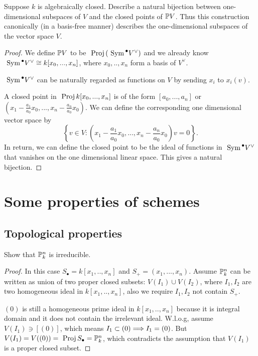 \documentclass[11pt]{book} %
\begin{document}
\begin{exr}
Suppose $k$ is algebraically closed. Describe a natural bijection between one-dimensional subspaces of $V$ and the closed points of $\mathbb P V$. Thus this construction canonically (in a basis-free manner) describes the one-dimensional subspaces of the vector space $V$.
\end{exr}
\begin{proof}
We define $\mathbb P V$ to be $\text{ Proj\,} (\text{ Sym\,}^\bullet V^\vee)$ and we already know $\text{ Sym\,}^\bullet V^\vee\cong k[x_0,...,x_n]$, where $x_0,..,x_n$ form a basis  of $V^\vee$.

$\text{ Sym\,}^\bullet V^\vee$ can be naturally regarded as functions on $V$ by sending $x_i$ to $x_i(v)$.

A closed point in $\text{ Proj\,} k[x_0,...,x_n]$ is of the form $[a_0,...,a_n]$ or $\left(x_1-\frac{a_1}{a_0}x_0,...,x_n-\frac{a_n}{a_0}x_0\right)$. We can define the corresponding one dimensional vector space by 
$$
\left\{v\in V: \left(x_1-\frac{a_1}{a_0}x_0,...,x_n-\frac{a_n}{a_0}x_0\right)v=0\right\}.
$$
In return, we can define the closed point to be the ideal of functions in $\text{ Sym\,}^\bullet V^\vee$ that vanishes on the one dimensional linear space.
This gives a natural bijection.
\end{proof}
\chapter{Some properties of schemes}
\section{Topological properties}
\begin{exr}
Show that $\mathbb P^n_k$ is irreducible.
\end{exr}
\begin{proof}
In this case $S_\bullet=k[x_1,..,x_n]$ and $S_+=(x_1,...,x_n)$.
Assume $\mathbb P^n_k$ can be written as union of two proper closed subsets: $V(I_1)\cup V(I_2)$, where $I_1,I_2$ are two homogeneous ideal in $k[x_1,..,x_n]$, also we require $I_1,I_2$ not contain $S_+$.

$(0)$ is still a homogeneous prime ideal in $k[x_1,..,x_n]$ because it is integral domain and it does not contain the irrelevant ideal. W.l.o.g, assume $V(I_1)\ni [(0)]$, which means $I_1\subset (0)\Longrightarrow I_1=(0)$. But $V(I_1)=V((0))=\text{ Proj\,} S_\bullet=\mathbb P^n_k$, which contradicts the assumption that $V(I_1)$ is a proper closed subset.
\end{proof}
\end{document}
